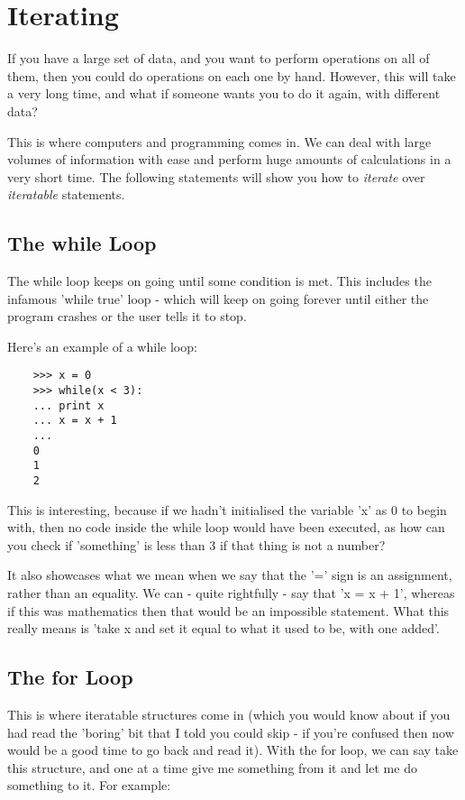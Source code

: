 \section{Iterating}

If you have a large set of data, and you want to perform operations on all of
them, then you could do operations on each one by hand. However, this will take
a very long time, and what if someone wants you to do it again, with different
data?

This is where computers and programming comes in. We can deal with large volumes
of information with ease and perform huge amounts of calculations in a very
short time. The following statements will show you how to \emph{iterate} over
\emph{iteratable} statements.

\subsection{The while Loop}

The while loop keeps on going until some condition is met. This includes the
infamous 'while true' loop - which will keep on going forever until either the
program crashes or the user tells it to stop.

Here's an example of a while loop:

\begin{lstlisting}
    >>> x = 0
    >>> while(x < 3):
    ... print x
    ... x = x + 1
    ...
    0
    1
    2
\end{lstlisting}

This is interesting, because if we hadn't initialised the variable 'x' as 0 to
begin with, then no code inside the while loop would have been executed, as how
can you check if 'something' is less than 3 if that thing is not a number?

It also showcases what we mean when we say that the '=' sign is an assignment,
rather than an equality. We can - quite rightfully - say that 'x = x + 1',
whereas if this was mathematics then that would be an impossible statement. What
this really means is 'take x and set it equal to what it used to be, with one
added'. 

\subsection{The for Loop}

This is where iteratable structures come in (which you would know about if you
had read the 'boring' bit that I told you could skip - if you're confused then
now would be a good time to go back and read it). With the for loop, we can say
take this structure, and one at a time give me something from it and let me
do something to it. For example:

